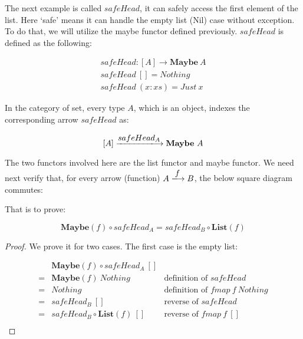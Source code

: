 \documentclass{article}
\begin{document}
\begin{example}
\normalfont
The next example is called $safeHead$, it can safely access the first element of the list. Here `safe' means it can handle the empty list (Nil) case without exception. To do that, we will utilize the maybe functor defined previously. $safeHead$ is defined as the following:

\[
\begin{array}{l}
safeHead : [A] \to \mathbf{Maybe}\ A \\
safeHead\ [] = Nothing \\
safeHead\ (x:xs) = Just\ x
\end{array}
\]

In the category of set, every type $A$, which is an object, indexes the corresponding arrow $safeHead$ as:

\[
[A] \arrowto{safeHead_A} \mathbf{Maybe}\ A
\]

The two functors involved here are the list functor and maybe functor. We need next verify that, for every arrow (function) $A \arrowto{f} B$, the below square diagram commutes:

\begin{center}
\end{center}

That is to prove:

\[
  \mathbf{Maybe}(f) \circ safeHead_A = safeHead_B \circ \mathbf{List}(f)
\]

\begin{proof}
We prove it for two cases. The first case is the empty list:

\[
\begin{array}{cll}
  & \mathbf{Maybe}(f) \circ safeHead_A\ [] & \\
= & \mathbf{Maybe}(f)\ Nothing & \text{definition of $safeHead$} \\
= & Nothing & \text{definition of $fmap\ f\ Nothing$} \\
= & safeHead_B\ [] & \text{reverse of $safeHead$} \\
= & safeHead_B \circ \mathbf{List}(f)\ [] & \text{reverse of $fmap\ f\ []$} \\
\end{array}
\]


\end{proof}
\end{example}
\end{document}
